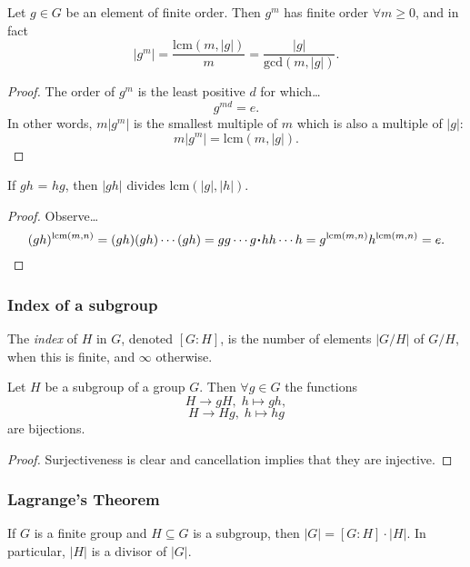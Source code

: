 \begin{proposition}
\label{orderofmultipleofelement}
Let $g \in G$ be an element of finite order. Then $g^m$ has finite order $\forall m \geq 0$, and in fact
$$|g^m| = \frac{\textrm{lcm}(m,|g|)}{m} = \frac{|g|}{\textrm{gcd}(m,|g|)}.$$
\end{proposition}

\begin{proof}
The order of $g^m$ is the least positive $d$ for which\dots
$$g^{md} = e.$$
In other words, $m|g^m|$ is the smallest multiple of $m$ which is also a multiple of $|g|$:
$$m|g^m| = \textrm{lcm}(m,|g|).$$
\end{proof}

\begin{proposition}
If $gh$ = $hg$, then $|gh|$ divides lcm$(|g|,|h|)$.
\end{proposition}

\begin{proof}
Observe\dots
$$(gh)^{\textrm{lcm}(m,n)} = (gh)(gh)\cdots(gh) = gg\cdots g \LargerCdot hh\cdots h = g^{\textrm{lcm}(m,n)}h^{\textrm{lcm}(m,n)} = e.$$
\end{proof}

\subsubsection{Index of a subgroup}\label{subgroupindex}
The \emph{index} of $H$ in $G$, denoted $[G:H]$, is the number of elements $|G/H|$ of $G/H$, when this is finite, and $\infty$ otherwise.

\begin{lemma}
\label{indexofcoset}
Let $H$ be a subgroup of a group $G$. Then $\forall g \in G$ the functions
$$H \rightarrow gH, \; h \mapsto gh,$$
$$H \rightarrow Hg, \; h \mapsto hg$$
are bijections.
\end{lemma}

\begin{proof}
Surjectiveness is clear and cancellation implies that they are injective.
\end{proof}

\subsubsection{Lagrange's Theorem}

\begin{corollary}
\label{lagrangesthm}
If $G$ is a finite group and $H \subseteq G$ is a subgroup, then $|G| = [G : H] \cdot |H|$. In particular, $|H|$ is a divisor of $|G|$.
\end{corollary}

